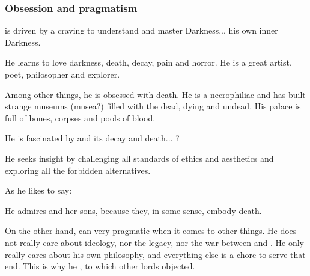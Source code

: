 \subsubsection{Obsession and pragmatism}
\Azraid{} is driven by a craving to understand and master Darkness... his own inner Darkness. 

He learns to love darkness, death, decay, pain and horror. He is a great artist, poet, philosopher and explorer.


Among other things, he is obsessed with death. 
He is a necrophiliac and has built strange museums (musea?) filled with the dead, dying and undead. 
His palace is full of bones, corpses and pools of blood. 

He is fascinated by \Erebos{} and its decay and death... ?

He seeks insight by challenging all standards of ethics and aesthetics and exploring all the forbidden alternatives.

As he likes to say: 

He admires  and her sons, because they, in some sense, embody death. 

On the other hand, \Azraid{} can very pragmatic when it comes to other things. He does not really care about ideology, nor the \bane{} legacy, nor the war between \banes{} and \dragons. He only really cares about his own philosophy, and everything else is a chore to serve that end. This is why he , to which other \resphan{} lords objected. 


